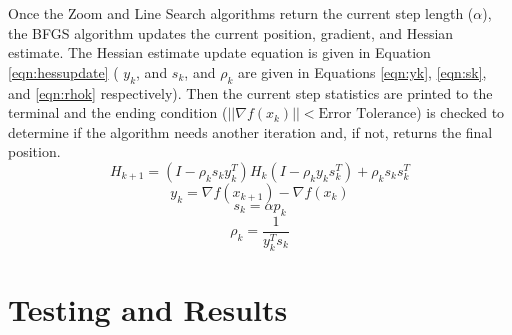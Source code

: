 \documentclass[11pt]{article}%
\begin{document}
Once the Zoom and Line Search algorithms return the current step length ($\alpha$), the BFGS algorithm updates the current position, gradient, and Hessian estimate. The Hessian estimate update equation is given in Equation \ref{eqn:hessupdate} \cite{textbook} ( $y_{k}$, and $s_{k}$, and $\rho_{k}$ are given in Equations \ref{eqn:yk},  \ref{eqn:sk}, and \ref{eqn:rhok} respectively). Then the current step statistics are printed to the terminal and the ending condition ($||\nabla f(x_{k})||<\text{Error Tolerance}$) is checked to determine if the algorithm needs another iteration and, if not, returns the final position.
\begin{equation}
\label{eqn:hessupdate}
H_{k+1}= (I-\rho_{k}s_{k}y_{k}^{T})H_{k}(I-\rho_{k}y_{k}s_{k}^{T})+\rho_{k}s_{k}s_{k}^{T}
\end{equation}
\begin{equation}
\label{eqn:yk}
y_{k}=\nabla f(x_{k+1})-\nabla f(x_{k})
\end{equation}
\begin{equation}
\label{eqn:sk}
s_{k}=\alpha p_{k}
\end{equation}
\begin{equation}
\label{eqn:rhok}
\rho_{k}=\frac{1}{y_{k}^{T}s_{k}}
\end{equation}

\section{Testing and Results}
\end{document}
